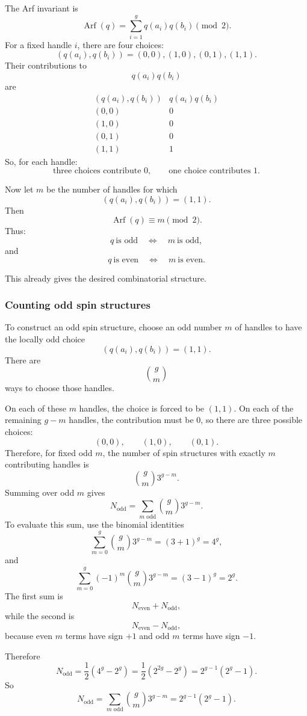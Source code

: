 \documentclass[
  10pt,
  a4paper,
  openany]{book}
\begin{document}
The Arf invariant is \[
\operatorname{Arf}(q)
=
\sum_{i=1}^g q(a_i)q(b_i)
\pmod 2.
\] For a fixed handle \(i\), there are four choices: \[
\left(q(a_i),q(b_i)\right)
=
(0,0),(1,0),(0,1),(1,1).
\] Their contributions to \[
q(a_i)q(b_i)
\] are \[
\begin{array}{c|c}
\left(q(a_i),q(b_i)\right) & q(a_i)q(b_i)\\
\hline
(0,0) & 0\\
(1,0) & 0\\
(0,1) & 0\\
(1,1) & 1
\end{array}
\] So, for each handle: \[
\text{three choices contribute }0,
\qquad
\text{one choice contributes }1.
\]

Now let \(m\) be the number of handles for which \[
\left(q(a_i),q(b_i)\right)=(1,1).
\] Then \[
\operatorname{Arf}(q)
\equiv
m
\pmod 2.
\] Thus: \[
q\ \text{is odd}
\quad\Longleftrightarrow\quad
m\ \text{is odd},
\] and \[
q\ \text{is even}
\quad\Longleftrightarrow\quad
m\ \text{is even}.
\]

This already gives the desired combinatorial structure.

\subsubsection{Counting odd spin
structures}\label{counting-odd-spin-structures}

To construct an odd spin structure, choose an odd number \(m\) of
handles to have the locally odd choice \[
\left(q(a_i),q(b_i)\right)=(1,1).
\] There are \[
\binom{g}{m}
\] ways to choose those handles.

On each of these \(m\) handles, the choice is forced to be \((1,1)\). On
each of the remaining \(g-m\) handles, the contribution must be \(0\),
so there are three possible choices: \[
(0,0),
\qquad
(1,0),
\qquad
(0,1).
\] Therefore, for fixed odd \(m\), the number of spin structures with
exactly \(m\) contributing handles is \[
\binom{g}{m}3^{g-m}.
\] Summing over odd \(m\) gives \[
N_{\text{odd}}
=
\sum_{m\text{ odd}}\binom{g}{m}3^{g-m}.
\] To evaluate this sum, use the binomial identities \[
\sum_{m=0}^g \binom{g}{m}3^{g-m}
=
(3+1)^g
=
4^g,
\] and \[
\sum_{m=0}^g (-1)^m\binom{g}{m}3^{g-m}
=
(3-1)^g
=
2^g.
\] The first sum is \[
N_{\text{even}}+N_{\text{odd}},
\] while the second is \[
N_{\text{even}}-N_{\text{odd}},
\] because even \(m\) terms have sign \(+1\) and odd \(m\) terms have
sign \(-1\).

Therefore \[
N_{\text{odd}}
=
\frac{1}{2}\left(4^g-2^g\right)
=
\frac{1}{2}\left(2^{2g}-2^g\right)
=
2^{g-1}(2^g-1).
\] So \[
\boxed{
N_{\text{odd}}
=
\sum_{m\text{ odd}}\binom{g}{m}3^{g-m}
=
2^{g-1}(2^g-1).
}
\]
\end{document}
